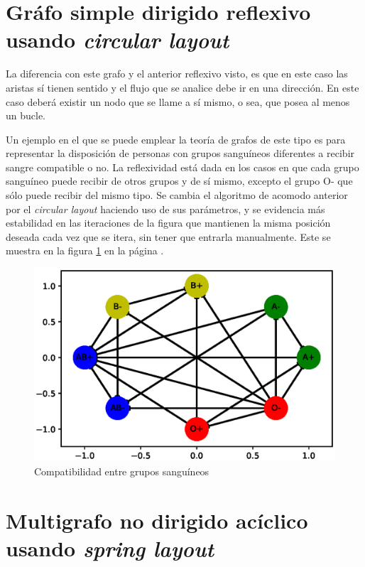 \documentclass{article}
\begin{document}
\section{Gráfo simple dirigido reflexivo usando \textit{circular layout}}

La diferencia con este grafo y el anterior reflexivo visto, es que en este caso las aristas sí tienen sentido y el flujo que se analice debe ir en una dirección. En este caso deberá existir un nodo que se llame a sí mismo, o sea, que posea al menos un bucle.

Un ejemplo en el que se puede emplear la teoría de grafos de este tipo es para representar la disposición  de personas con grupos sanguíneos diferentes a recibir sangre compatible o no. La reflexividad está dada en los casos en que cada grupo sanguíneo puede recibir de otros grupos y de sí mismo, excepto el grupo O- que sólo puede recibir del mismo tipo. Se cambia el algoritmo de acomodo anterior por el \textit{circular layout} haciendo uso de sus parámetros, y se evidencia más estabilidad en las iteraciones de la figura que mantienen la misma posición deseada cada vez que se itera, sin tener que entrarla manualmente.
Este se muestra en la figura \ref{fig:Fig06} en la página \pageref{fig:Fig06}.

\newpage


\begin{figure}[htbp]
    \centering
    \includegraphics[scale=0.6]{imagenes1/Fig06.eps}
    \caption{Compatibilidad entre grupos sanguíneos}
    \label{fig:Fig06}
\end{figure}

\section{Multigrafo no dirigido acíclico usando \textit{spring layout}}
\end{document}

